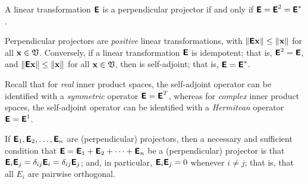 A  linear transformation $\textsf{\textbf{E}}$ is a perpendicular projector
if and only if
$\textsf{\textbf{E}} = \textsf{\textbf{E}}^2=\textsf{\textbf{E}}^*$.

Perpendicular projectors are {\em positive} linear transformations,
with
$\left\| \textsf{\textbf{E}}{\bf x} \right\| \le \| {\bf x} \|$
for all
${\bf x} \in {\frak V}$.
Conversely,
if a linear transformation $\textsf{\textbf{E}}$
is idempotent; that is,
$\textsf{\textbf{E}}^2=\textsf{\textbf{E}}$,
and  $\left\| \textsf{\textbf{E}}{\bf x} \right\| \le \| {\bf x} \|$
for all
${\bf x} \in {\frak V}$,
then  is self-adjoint; that is,
$\textsf{\textbf{E}}=\textsf{\textbf{E}}^\ast$.

Recall that
for {\em real} inner product spaces, the self-adjoint operator can be identified with a {\em symmetric} operator
$\textsf{\textbf{E}}=\textsf{\textbf{E}}^T$,
whereas
for {\em complex} inner product spaces, the self-adjoint operator can be identified with a {\em Hermitean} operator
$\textsf{\textbf{E}}=\textsf{\textbf{E}}^\dagger$.


If $\textsf{\textbf{E}}_1,\textsf{\textbf{E}}_2, \ldots , \textsf{\textbf{E}}_n$ are (perpendicular)
projectors,
then a necessary and sufficient condition that
$\textsf{\textbf{E}} =\textsf{\textbf{E}}_1+\textsf{\textbf{E}}_2+\cdots +\textsf{\textbf{E}}_n$
be a (perpendicular) projector is that
 $\textsf{\textbf{E}}_i \textsf{\textbf{E}}_j =\delta_{ij}\textsf{\textbf{E}}_i =\delta_{ij}\textsf{\textbf{E}}_j$;
and, in particular,
$\textsf{\textbf{E}}_i \textsf{\textbf{E}}_j =0$
whenever $i\neq j$; that is, that all $E_i$ are pairwise orthogonal.

